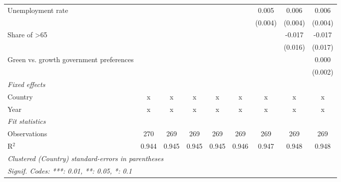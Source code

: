 \begin{table}[htbp]
\begin{tabular}{lcccccccc}
      Unemployment rate                                              &         &         &         &         &         & 0.005   & 0.006   & 0.006\\   
                                                                     &         &         &         &         &         & (0.004) & (0.004) & (0.004)\\   
      Share of >65                                                   &         &         &         &         &         &         & -0.017  & -0.017\\   
                                                                     &         &         &         &         &         &         & (0.016) & (0.017)\\   
      Green vs. growth government preferences                        &         &         &         &         &         &         &         & 0.000\\   
                                                                     &         &         &         &         &         &         &         & (0.002)\\   
      \emph{Fixed effects}\\
      Country                                                        & x       & x       & x       & x       & x       & x       & x       & x\\  
      Year                                                           & x       & x       & x       & x       & x       & x       & x       & x\\  
      \midrule \emph{Fit statistics}\\
      Observations                                                   & 270     & 269     & 269     & 269     & 269     & 269     & 269     & 269\\  
      R$^2$                                                          & 0.944   & 0.945   & 0.945   & 0.945   & 0.946   & 0.947   & 0.948   & 0.948\\  
      \midrule
      \multicolumn{9}{l}{\emph{Clustered (Country) standard-errors in parentheses}}\\
      \multicolumn{9}{l}{\emph{Signif. Codes: ***: 0.01, **: 0.05, *: 0.1}}\\
   \end{tabular}
\end{table}


